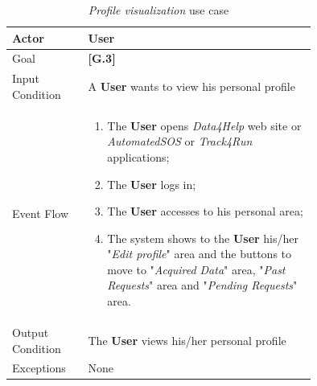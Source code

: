 \begin{center}
\begin{table}[H]
\begin{tabular}{ | l | p{0.75\linewidth} | }
  \hline
    Actor & \textbf{User} \\ \hline
    Goal & \textbf{[G.3]} \\ \hline
    Input Condition & A \textbf{User} wants to view his personal profile\\ \hline
    Event Flow & \begin{minipage}[t]{0.7\textwidth}
      \begin{enumerate}
        \item The \textbf{User} opens \textit{Data4Help} web site or \textit{AutomatedSOS} or \textit{Track4Run} applications;
        \item The \textbf{User} logs in;
        \item The \textbf{User} accesses to his personal area;
        \item The system shows to the \textbf{User} his/her "\textit{Edit profile}" area and the buttons to move to "\textit{Acquired Data}" area, "\textit{Past Requests}" area and "\textit{Pending Requests}" area.
      \end{enumerate}
    \smallskip
  \end{minipage} \\ \hline
  Output Condition & The \textbf{User} views his/her personal profile\\ \hline
  Exceptions & None \\ \hline
\end{tabular}
\caption{\textit{Profile visualization} use case}
\label{table:profileVisualizationTable}
\end{table}
\end{center}

